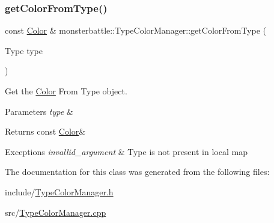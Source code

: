 \subsubsection{\texorpdfstring{get\+Color\+From\+Type()}{getColorFromType()}}
{\footnotesize\ttfamily const \hyperlink{structmonsterbattle_1_1Color}{Color} \& monsterbattle\+::\+Type\+Color\+Manager\+::get\+Color\+From\+Type (\begin{DoxyParamCaption}\item[{Type}]{type }\end{DoxyParamCaption})}



Get the \hyperlink{structmonsterbattle_1_1Color}{Color} From Type object. 


\begin{DoxyParams}{Parameters}
{\em type} & \\
\hline
\end{DoxyParams}
\begin{DoxyReturn}{Returns}
const \hyperlink{structmonsterbattle_1_1Color}{Color}\&
\end{DoxyReturn}

\begin{DoxyExceptions}{Exceptions}
{\em invallid\+\_\+argument} & Type is not present in local map \\
\hline
\end{DoxyExceptions}


The documentation for this class was generated from the following files\+:\begin{DoxyCompactItemize}
\item 
include/\hyperlink{TypeColorManager_8h}{Type\+Color\+Manager.\+h}\item 
src/\hyperlink{TypeColorManager_8cpp}{Type\+Color\+Manager.\+cpp}\end{DoxyCompactItemize}
